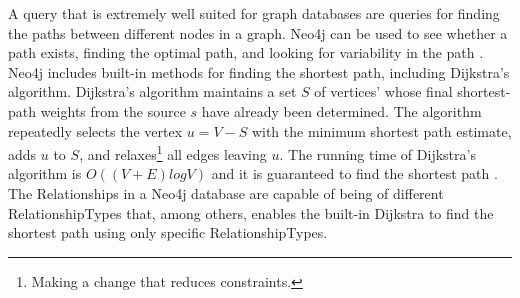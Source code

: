A query that is extremely well suited for graph databases are queries for finding the paths between different nodes in a graph. Neo4j can be used to see whether a path exists, finding the optimal path, and looking for variability in the path \citep[p. 51]{bruggen14}. Neo4j includes built-in methods for finding the shortest path, including Dijkstra's algorithm. Dijkstra's algorithm \citep[p.658-662]{cormen09} maintains a set $S$ of vertices' whose final shortest-path weights from the source $s$ have already been determined. The algorithm repeatedly selects the vertex $u = V - S$ with the minimum shortest path estimate, adds $u$ to $S$, and relaxes\footnote{Making a change that reduces constraints.} all edges leaving $u$. The running time of Dijkstra's algorithm is $O((V + E)log V)$ and it is guaranteed to find the shortest path \citep[p.~661]{cormen09}. %
The Relationships in a Neo4j database are capable of being of different RelationshipTypes that, among others, enables the built-in Dijkstra to find the shortest path using only specific RelationshipTypes.





